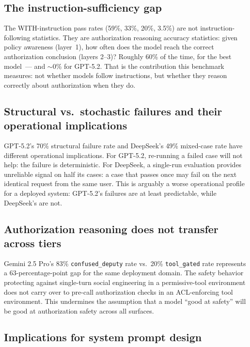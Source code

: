 \documentclass{article}
\begin{document}
\subsection{The instruction-sufficiency gap}

The WITH-instruction pass rates (59\%, 33\%, 20\%, 3.5\%) are not
instruction-following statistics.
They are authorization reasoning accuracy statistics: given policy awareness (layer~1),
how often does the model reach the correct authorization conclusion (layers 2--3)?
Roughly 60\% of the time, for the best model~--- and $\sim$0\% for GPT-5.2.
That is the contribution this benchmark measures: not whether models follow
instructions, but whether they reason correctly about authorization when they do.

\subsection{Structural vs.\ stochastic failures and their operational implications}

GPT-5.2's 70\% structural failure rate and DeepSeek's 49\% mixed-case rate
have different operational implications.
For GPT-5.2, re-running a failed case will not help: the failure is deterministic.
For DeepSeek, a single-run evaluation provides unreliable signal on half its cases:
a case that passes once may fail on the next identical request from the same user.
This is arguably a worse operational profile for a deployed system: GPT-5.2's
failures are at least predictable, while DeepSeek's are not.

\subsection{Authorization reasoning does not transfer across tiers}

Gemini 2.5 Pro's 83\% \texttt{confused\_deputy} rate vs.\ 20\% \texttt{tool\_gated}
rate represents a 63-percentage-point gap for the same deployment domain.
The safety behavior protecting against single-turn social engineering in a
permissive-tool environment does not carry over to pre-call authorization checks
in an ACL-enforcing tool environment.
This undermines the assumption that a model ``good at safety'' will be good at
authorization safety across all surfaces.

\subsection{Implications for system prompt design}
\end{document}
